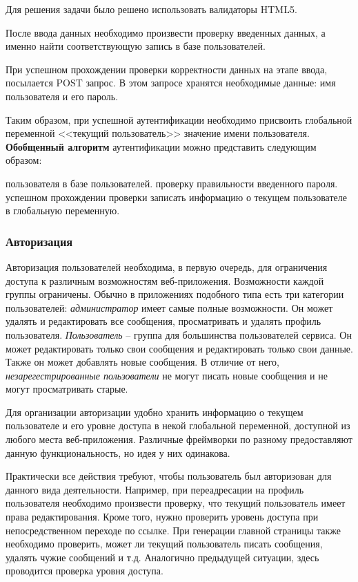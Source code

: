 \documentclass[a4paper]{article}
\begin{document}
Для решения задачи было решено использовать валидаторы HTML5.

После ввода данных необходимо произвести проверку введенных данных, а именно найти соответствующую запись в базе пользователей.

При успешном прохождении проверки корректности данных на этапе ввода, посылается POST запрос. В этом запросе хранятся необходимые данные: имя пользователя и его пароль. 

Таким образом, при успешной аутентификации необходимо присвоить глобальной переменной <<текущий пользователь>> значение имени пользователя.\\

\textbf{Обобщенный алгоритм} аутентификации можно представить следующим образом:

\begin{enumerate}
 пользователя в базе пользователей.
 проверку правильности введенного пароля.
 успешном прохождении проверки записать информацию о текущем пользователе в глобальную переменную.
\end{enumerate}

\subsubsection{Авторизация}

Авторизация пользователей необходима, в первую очередь, для ограничения доступа к различным возможностям веб-приложения. Возможности каждой группы ограничены. Обычно в приложениях подобного типа есть три категории пользователей: \textit{администратор} имеет самые полные возможности. Он может удалять и редактировать все сообщения, просматривать и удалять профиль пользователя. \textit{Пользователь} -- группа для большинства пользователей сервиса. Он может редактировать только свои сообщения и редактировать только свои данные. Также он может добавлять новые сообщения. В отличие от него, \textit{незарегестрированные пользователи} не могут писать новые сообщения и не могут просматривать старые.

Для организации авторизации удобно хранить информацию о текущем пользователе и его уровне доступа в некой глобальной переменной, доступной из любого места веб-приложения. Различные фреймворки по разному предоставляют данную функциональность, но идея у них одинакова.

Практически все действия требуют, чтобы пользователь был авторизован для данного вида деятельности. Например, при переадресации на профиль пользователя необходимо произвести проверку, что текущий пользователь имеет права редактирования. Кроме того, нужно проверить уровень доступа при непосредственном переходе по ссылке. При генерации главной страницы также необходимо проверить, может ли текущий пользователь писать сообщения, удалять чужие сообщений и т.д. Аналогично предыдущей ситуации, здесь проводится проверка уровня доступа.
\end{document}

